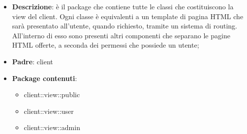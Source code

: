 \begin{itemize}
	\item \textbf{Descrizione}: è il package che contiene tutte le classi che costituiscono la view del client. Ogni classe è equivalenti a un template di pagina HTML che sarà presentato all'utente, quando richiesto, tramite un sistema di routing. \newline
	All'interno di esso sono presenti altri componenti che separano le pagine HTML offerte, a seconda dei permessi che possiede un utente;
	\item \textbf{Padre}: client
	\item \textbf{Package contenuti}:
		\begin{itemize}
			\item client::view::public
			\item client::view::user
			\item client::view::admin
		\end{itemize}
\end{itemize}

\pagebreak

